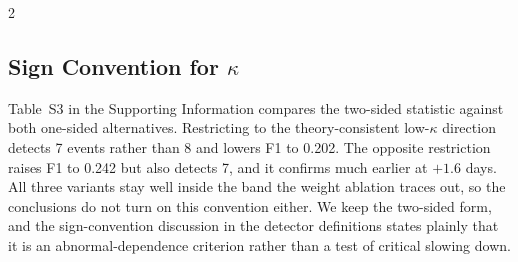 \documentclass{book}
\begin{document}
\begin{multicols}{2}
\subsection{Sign Convention for $\kappa$}
\label{sec:kappasign}
Table~S3 in the Supporting Information compares the two-sided statistic against both one-sided alternatives. Restricting to the theory-consistent low-$\kappa$ direction detects 7 events rather than 8 and lowers F1 to 0.202. The opposite restriction raises F1 to 0.242 but also detects 7, and it confirms much earlier at $+1.6$ days. All three variants stay well inside the band the weight ablation traces out, so the conclusions do not turn on this convention either. We keep the two-sided form, and the sign-convention discussion in the detector definitions states plainly that it is an abnormal-dependence criterion rather than a test of critical slowing down.
\end{multicols}
\end{document}
